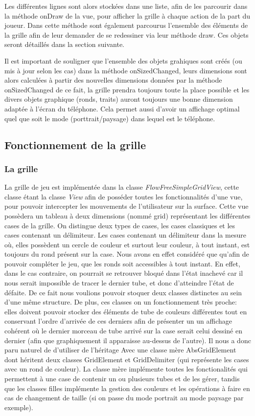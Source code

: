 \documentclass[12pt, a4paper]{article}%
\begin{document}
    Les différentes lignes sont alors stockées dans une liste, afin de les parcourir dans la méthode onDraw de la vue, pour
    afficher la grille à chaque action de la part du joueur. Dans cette méthode sont également parcourus l'ensemble des éléments
    de la grille afin de leur demander de se redessiner via leur méthode draw. Ces objets seront détaillés dans la section
    suivante.
    \newline

    Il est important de souligner que l'ensemble des objets grahiques sont créés (ou mis à jour selon les cas) dans la méthode
    onSizedChanged, leurs dimensions sont alors calculées à partir des nouvelles dimensions données par la méthode onSizedChanged
    de ce fait, la grille prendra toujours toute la place possible et les divers objets graphique (ronds, traits) auront toujours
    une bonne dimension adaptée à l'écran du téléphone. Cela permet aussi d'avoir un affichage optimal quel que soit le mode
    (porttrait/paysage) dans lequel est le téléphone.
    \subsection{Fonctionnement de la grille}
    \subsubsection{La grille}
    La grille de jeu est implémentée dans la classe \textit{FlowFreeSimpleGridView}, cette classe étant la classe \textit{View}
afin de posséder toutes les fonctionnalités d'une vue, pour pouvoir intercepter les mouvements de l'utilisateur sur la surface.
Cette vue possèdera un tableau à deux dimensions (nommé grid) représentant les différentes cases de la grille. On distingue deux
types de cases, les cases classiques et les cases contenant un délimiteur. Les cases contenant un délimiteur dans la mesure où,
elles possèdent un cercle de couleur et surtout leur couleur, à tout instant, est toujours du rond présent sur la case. Nous avons
en effet considéré que qu'afin de pouvoir compléter le jeu, que les ronds soit accessibles à tout instant. En effet, dans le cas
contraire, on pourrait se retrouver bloqué dans l'état inachevé car il nous serait impossible de tracer le dernier tube, et donc
d'atteindre l'état de défaite. De ce fait nous voulions pouvoir stoquer deux classes distinctes au sein d'une même structure. De
plus, ces classes on un fonctionnement très proche: elles doivent pouvoir stocker des éléments de tube de couleurs différentes
tout en conservant l'ordre d'arrivée de ces derniers afin de présenter un un affichage cohérent où le dernier morceau de tube
arrivé sur la case serait celui dessiné en dernier (afin que graphiquement il apparaisse au-dessus de l'autre). Il nous a donc
paru naturel de d'utiliser de l'héritage Avec une classe mère AbsGridElement dont héritent deux classes GridElement et
GridDelimiter (qui représente les cases avec un rond de couleur). La classe mère implémente toutes les fonctionalités qui
permettent à une case de contenir un ou plusieurs tubes et de les gérer, tandis que les classes filles implémente la gestion des
couleurs et les opérations à faire en cas de changement de taille (si on passe du mode portrait au mode paysage par exemple).
\end{document}
